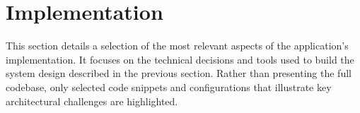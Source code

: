 \section{Implementation}

This section details a selection of the most relevant aspects of the application’s implementation. It focuses on the technical decisions and tools used to build the system design described in the previous section. Rather than presenting the full codebase, only selected code snippets and configurations that illustrate key architectural challenges are highlighted.



